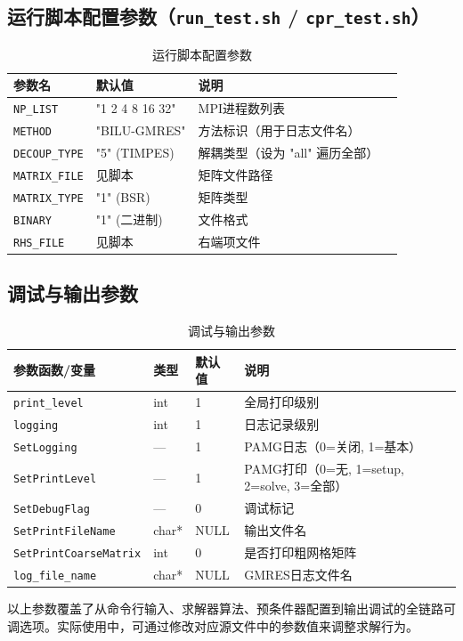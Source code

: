 \documentclass[12pt,a4paper]{article}
\begin{document}
\subsection{运行脚本配置参数（\texttt{run\_test.sh} / \texttt{cpr\_test.sh}）}

\begin{table}[htbp]
\centering
\caption{运行脚本配置参数}
\label{tab:params_script}
\begin{tabular}{llll}
\toprule
参数名 & 默认值 & 说明 \\
\midrule
\texttt{NP\_LIST} & "1 2 4 8 16 32" & MPI进程数列表 \\
\texttt{METHOD} & "BILU-GMRES" & 方法标识（用于日志文件名） \\
\texttt{DECOUP\_TYPE} & "5" (TIMPES) & 解耦类型（设为 "all" 遍历全部） \\
\texttt{MATRIX\_FILE} & 见脚本 & 矩阵文件路径 \\
\texttt{MATRIX\_TYPE} & "1" (BSR) & 矩阵类型 \\
\texttt{BINARY} & "1" (二进制) & 文件格式 \\
\texttt{RHS\_FILE} & 见脚本 & 右端项文件 \\
\bottomrule
\end{tabular}
\end{table}

\subsection{调试与输出参数}

\begin{table}[htbp]
\centering
\caption{调试与输出参数}
\label{tab:params_debug}
\begin{tabular}{llll}
\toprule
参数函数/变量 & 类型 & 默认值 & 说明 \\
\midrule
\texttt{print\_level} & int & 1 & 全局打印级别 \\
\texttt{logging} & int & 1 & 日志记录级别 \\
\texttt{SetLogging} & --- & 1 & PAMG日志（0=关闭, 1=基本） \\
\texttt{SetPrintLevel} & --- & 1 & PAMG打印（0=无, 1=setup, 2=solve, 3=全部） \\
\texttt{SetDebugFlag} & --- & 0 & 调试标记 \\
\texttt{SetPrintFileName} & char* & NULL & 输出文件名 \\
\texttt{SetPrintCoarseMatrix} & int & 0 & 是否打印粗网格矩阵 \\
\texttt{log\_file\_name} & char* & NULL & GMRES日志文件名 \\
\bottomrule
\end{tabular}
\end{table}

以上参数覆盖了从命令行输入、求解器算法、预条件器配置到输出调试的全链路可调选项。实际使用中，可通过修改对应源文件中的参数值来调整求解行为。
\end{document}
